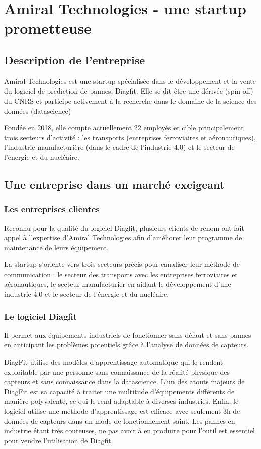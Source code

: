 \section{Amiral Technologies - une startup prometteuse}
\subsection{Description de l'entreprise}
Amiral Technologies est une startup spécialisée dans le développement et la vente du logiciel de prédiction de pannes, Diagfit. Elle se dit être une dérivée (spin-off) du CNRS et participe activement à la recherche dans le domaine de la science des données (datascience)

Fondée en 2018, elle compte actuellement 22 employés et cible principalement trois secteurs d'activité : les transports (entreprises ferroviaires et aéronautiques), l'industrie manufacturière (dans le cadre de l'industrie 4.0) et le secteur de l'énergie et du nucléaire.

\subsection{Une entreprise dans un marché exeigeant}
\subsubsection{Les entreprises clientes}
Reconnu pour la qualité du logiciel Diagfit, plusieurs clients de renom ont fait appel à l’expertise d’Amiral Technologies afin d'améliorer leur programme de maintenance de leurs équipement.

La startup s'oriente vers trois secteurs précis pour canaliser leur méthode de communication : le secteur des transports avec les entreprises ferroviaires et aéronautiques, le secteur manufacturier en aidant le développement d'une industrie 4.0 et le secteur de l'énergie et du nucléaire.


\subsubsection{Le logiciel Diagfit}
Il permet aux équipements industriels de fonctionner sans défaut et sans pannes en anticipant les problèmes potentiels grâce à l'analyse de données de capteurs.

DiagFit utilise des modèles d'apprentissage automatique qui le rendent exploitable par une personne sans connaissance de la réalité physique des capteurs et sans connaissance dans la datascience.
L'un des atouts majeurs de DiagFit est sa capacité à traiter une multitude d'équipements différents de manière polyvalente, ce qui le rend adaptable à diverses industries.
Enfin, le logiciel utilise une méthode d'apprentissage est efficace avec seulement 3h de données de capteurs dans un mode de fonctionnement saint.
Les pannes en industrie étant très couteuses, ne pas avoir à en produire pour l'outil est essentiel pour vendre l'utilisation de Diagfit.

